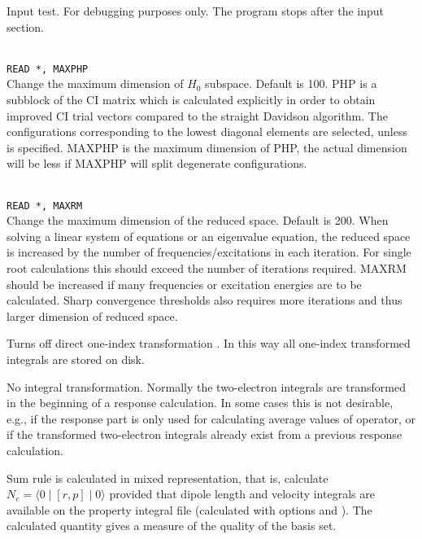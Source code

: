 \begin{description}
\item{}
Input test. For debugging purposes only. The program stops after the
input section.

\item{}\\
\verb|READ *, MAXPHP|\\
Change the maximum dimension of $H_0$ subspace.   Default is 100.
PHP is a subblock of the CI matrix which is calculated explicitly
in order to obtain improved CI trial vectors compared to the
straight Davidson algorithm\cite{erdjcp17}.  The configurations
corresponding to 
the lowest diagonal elements are selected, unless  is
specified. MAXPHP is the maximum dimension of PHP, the 
actual dimension will be less if MAXPHP will split degenerate configurations.
 
\item{}\\
\verb|READ *, MAXRM |\\
Change the maximum dimension of the reduced space. Default is 200.
When solving a linear system of equations or an eigenvalue equation,
the reduced space is increased by the number of
frequencies/excitations in each iteration. For single root
calculations this should exceed the number of iterations required.
MAXRM should be increased if many frequencies or excitation energies
are to be calculated.
Sharp convergence thresholds also requires
more iterations and thus larger dimension of reduced space.

\item{}
Turns off direct one-index transformation \cite{ovhahjajjcc15}. 
In this way all one-index transformed integrals are stored on disk.

\item{}
No integral transformation. Normally the two-electron integrals are 
transformed in the beginning of a response calculation. In some cases
this is not desirable, e.g., if the response part is only used for
calculating average values of operator, or if the transformed two-electron
integrals already exist from a previous response calculation. 

\item{}
Sum rule is calculated in mixed representation, that is, calculate
$N_e=\langle0\mid [r,p] \mid0\rangle$ provided that dipole length and
velocity integrals are available on the property integral file 
(calculated with  options  and ).
The calculated quantity gives a measure of the quality of the basis
set.


\end{description}
